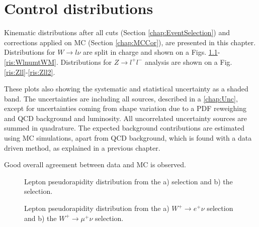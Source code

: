 \chapter{Control distributions}

Kinematic distributions after all cuts (Section \ref{chap:EventSelection}) and corrections applied on MC (Section \ref{chap:MCCor}), are presented in this chapter. Distributions for $W \to l\nu$ are split in charge and shown on a Figs. \ref{ris:WlnuLep}- \ref{ris:WlnumtWM}. Distributions for $Z \to l^{+}l^{-}$ analysis are shown on a Fig. \ref{ris:Zll}-\ref{ris:Zll2}.  

These plots also showing the systematic and statistical uncertainty as a shaded band. The uncertainties are including all sources, described in a \ref{chap:Unc}, except for uncertainties coming from shape variation due to a PDF reweighing and QCD background and luminosity.  All uncorrelated uncertainty sources are summed in quadrature. The expected background contributions are estimated using MC simulations, apart from QCD background, which is found with a data driven method, as explained in a previous chapter.

Good overall agreement between data and MC is observed.



\begin{figure}[h]
\begin{minipage}[h]{0.49\linewidth}
\end{minipage}
\hfill
\begin{minipage}[h]{0.49\linewidth}
\end{minipage}
\caption{Lepton pseudorapidity distribution from the a) \wenu selection and  b) the \wmunu selection.}
\label{ris:WlnuLep}
\end{figure}

\begin{figure}[h]
\begin{minipage}[h]{0.49\linewidth}
\end{minipage}
\hfill
\begin{minipage}[h]{0.49\linewidth}
\end{minipage}
\label{ris:WlnuPLep}
\caption{Lepton pseudorapidity distribution from the a) $W^{+} \to e^{+} \nu$ selection and  b) the $W^{+} \to \mu^{+} \nu$ selection.}
\end{figure}

